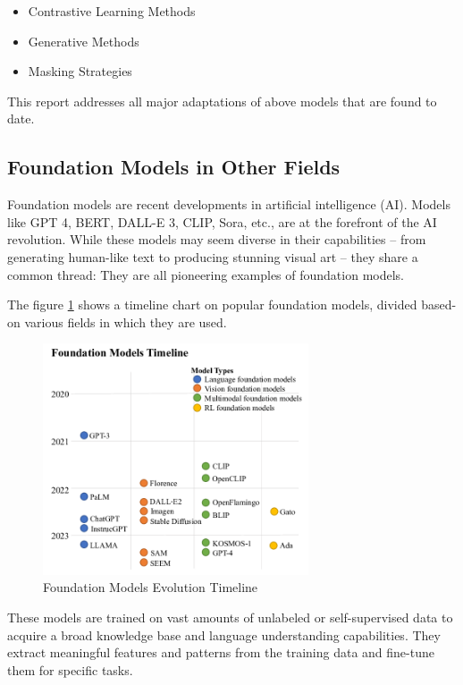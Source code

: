 \documentclass[letterpaper,12pt]{article}
\begin{document}
\begin{spacing}{1.125}
\begin{itemize}
  \item Contrastive Learning Methods
  \item Generative Methods
  \item Masking Strategies
\end{itemize}

This report addresses all major adaptations of above models that are found to
date.

\subsection{Foundation Models in Other Fields}

Foundation models are recent developments in artificial intelligence (AI). Models
like GPT 4, BERT, DALL-E 3, CLIP, Sora, etc., are at the forefront of the AI revolution.
While these models may seem diverse in their capabilities – from generating human-like
text to producing stunning visual art – they share a common thread: They are all
pioneering examples of foundation models.

The figure \ref{timeline} shows a timeline chart on popular foundation
models, divided based-on various fields in which they are used.

\begin{figure}[!ht]
  \includegraphics[width=0.7\textwidth]{timeline.png}
  \caption{Foundation Models Evolution Timeline}
  \label{timeline}
\end{figure}

These models are trained on vast amounts of unlabeled or self-supervised data to acquire a
broad knowledge base and language understanding capabilities. They extract meaningful
features and patterns from the training data and fine-tune them for specific tasks.


\end{spacing}
\end{document}
